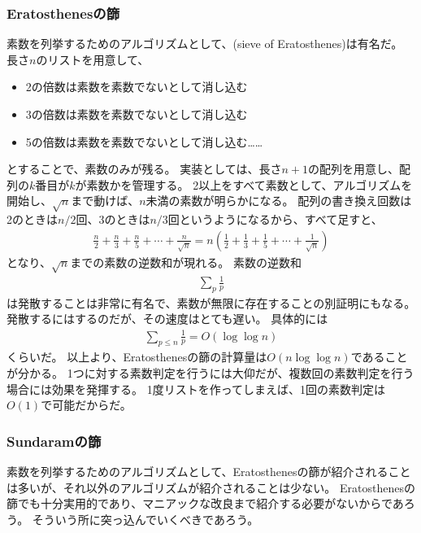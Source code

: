 \subsubsection{Eratosthenesの篩}
素数を列挙するためのアルゴリズムとして、(sieve of Eratosthenes)は有名だ。
長さ$n$のリストを用意して、
\begin{itemize}
 \item 2の倍数は素数を素数でないとして消し込む
 \item 3の倍数は素数を素数でないとして消し込む
 \item 5の倍数は素数を素数でないとして消し込む……
\end{itemize}
とすることで、素数のみが残る。
実装としては、長さ$n+1$の配列を用意し、配列の$k$番目が$k$が素数かを管理する。
2以上をすべて素数として、アルゴリズムを開始し、$\sqrt{n}$まで動けば、$n$未満の素数が明らかになる。
配列の書き換え回数は2のときは$n/2$回、3のときは$n/3$回というようになるから、すべて足すと、
\begin{align*}
\frac{n}{2} + \frac{n}{3} + \frac{n}{5} + \cdots + \frac{n}{\sqrt{n}} = n\left(\frac{1}{2}+\frac{1}{3}+\frac{1}{5}+\cdots+\frac{1}{\sqrt{n}}\right)
\end{align*}
となり、$\sqrt{n}$までの素数の逆数和が現れる。
素数の逆数和
\begin{align*}
\sum_p \frac{1}{p}
\end{align*}
は発散することは非常に有名で、素数が無限に存在することの別証明にもなる。
発散するにはするのだが、その速度はとても遅い。
具体的には
\begin{align*}
\sum_{p\le n}\frac{1}{p} = O(\log{\log{n}})
\end{align*}
くらいだ。
以上より、Eratosthenesの篩の計算量は$O(n\log{\log{n}})$であることが分かる。
1つに対する素数判定を行うには大仰だが、複数回の素数判定を行う場合には効果を発揮する。
1度リストを作ってしまえば、1回の素数判定は$O(1)$で可能だからだ。


\subsubsection{Sundaramの篩}
素数を列挙するためのアルゴリズムとして、Eratosthenesの篩が紹介されることは多いが、それ以外のアルゴリズムが紹介されることは少ない。
Eratosthenesの篩でも十分実用的であり、マニアックな改良まで紹介する必要がないからであろう。
そういう所に突っ込んでいくべきであろう。

